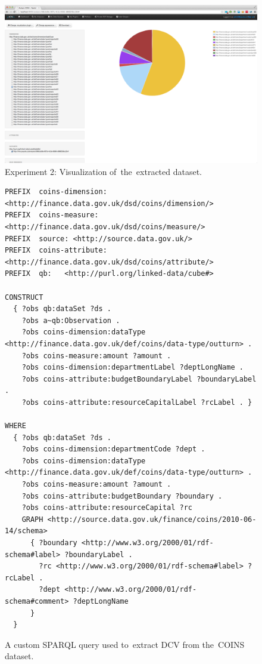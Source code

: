\begin{figure}
  \centering
  \includegraphics[width=140mm]{img/payola-exp-02-result.png}
  \caption{Experiment 2: Visualization of~the~extracted dataset.}
  \label{fig:payola-exp-02-result}
\end{figure}

\begin{figure}
  \scriptsize
\begin{verbatim}
PREFIX  coins-dimension: <http://finance.data.gov.uk/dsd/coins/dimension/>
PREFIX  coins-measure: <http://finance.data.gov.uk/dsd/coins/measure/>
PREFIX  source: <http://source.data.gov.uk/>
PREFIX  coins-attribute: <http://finance.data.gov.uk/dsd/coins/attribute/>
PREFIX  qb:   <http://purl.org/linked-data/cube#>

CONSTRUCT 
  { ?obs qb:dataSet ?ds .
    ?obs a~qb:Observation .
    ?obs coins-dimension:dataType <http://finance.data.gov.uk/def/coins/data-type/outturn> .
    ?obs coins-measure:amount ?amount .
    ?obs coins-dimension:departmentLabel ?deptLongName .
    ?obs coins-attribute:budgetBoundaryLabel ?boundaryLabel .
    ?obs coins-attribute:resourceCapitalLabel ?rcLabel . }

WHERE
  { ?obs qb:dataSet ?ds .
    ?obs coins-dimension:departmentCode ?dept .
    ?obs coins-dimension:dataType <http://finance.data.gov.uk/def/coins/data-type/outturn> .
    ?obs coins-measure:amount ?amount .
    ?obs coins-attribute:budgetBoundary ?boundary .
    ?obs coins-attribute:resourceCapital ?rc
    GRAPH <http://source.data.gov.uk/finance/coins/2010-06-14/schema>
      { ?boundary <http://www.w3.org/2000/01/rdf-schema#label> ?boundaryLabel .
        ?rc <http://www.w3.org/2000/01/rdf-schema#label> ?rcLabel .
        ?dept <http://www.w3.org/2000/01/rdf-schema#comment> ?deptLongName
      }
  }
\end{verbatim}
\caption{A custom SPARQL query used to~extract DCV from the~COINS dataset.}
\label{fig:custom-coins-query}
\end{figure}

